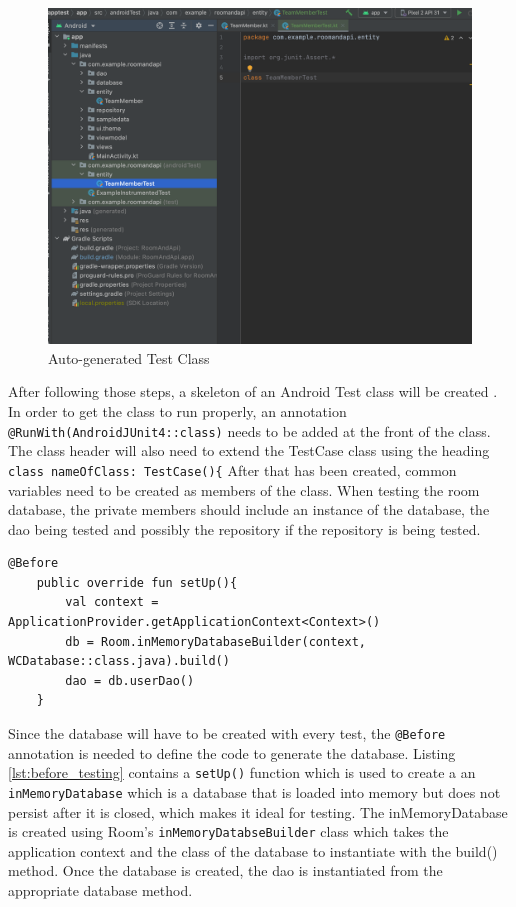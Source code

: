 \documentclass[12pt]{article}
\begin{document}
 \begin{figure}[H]
    \centering
    \includegraphics[trim=10 10 10 50, clip, width=\textwidth] {images/testing/5_result.png}
    \caption{Auto-generated Test Class}
    \label{fig:test_step_5}
\end{figure}
 
 After following those steps, a skeleton of an  Android Test class will be created . In order to get the class to run properly, an annotation \verb|@RunWith(AndroidJUnit4::class)| needs to be added at the front of the class. The class header will also need to extend the TestCase class using the heading \verb|class nameOfClass: TestCase(){| After that has been created, common variables need to be created as members of the class. When testing the room database, the private members should include an instance of the database, the dao being tested and possibly the repository if the repository is being tested.  

 \begin{lstlisting}[numbers=none, 
			caption=Code to Set up the Database in Test,
			label={lst:before_testing}]
@Before
    public override fun setUp(){
        val context = ApplicationProvider.getApplicationContext<Context>()
        db = Room.inMemoryDatabaseBuilder(context, WCDatabase::class.java).build()
        dao = db.userDao()
    }
\end{lstlisting}
 Since the database will have to be created with every test,  the \verb|@Before| annotation is needed to define the code to generate the database. Listing \ref{lst:before_testing} contains a \verb|setUp()| function which is used to create a an \verb|inMemoryDatabase| which is a database that is loaded into memory but does not persist after it is closed, which makes it ideal for testing. The inMemoryDatabase is created using Room's \verb|inMemoryDatabseBuilder| class which takes the application context and the class of the database to instantiate with the build() method. Once the database is created, the dao is instantiated from the appropriate database method.
\end{document}
